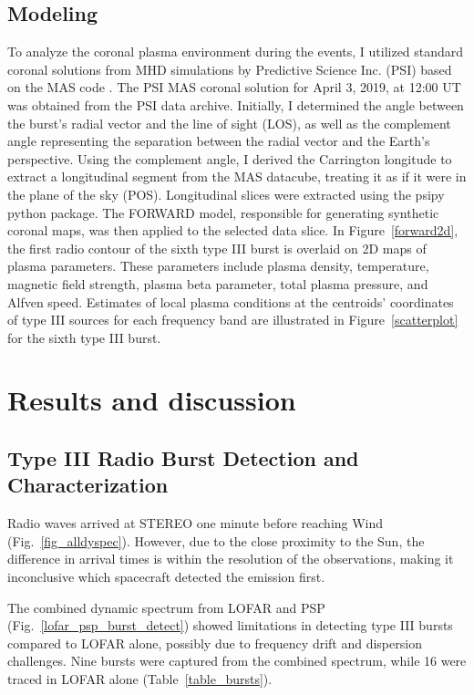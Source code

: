 \subsection{Modeling}
To analyze the coronal plasma environment during the events, I utilized standard coronal solutions from MHD simulations by Predictive Science Inc. (PSI) based on the MAS code \citep{mhd_1999}. The PSI MAS coronal solution for April 3, 2019, at 12:00 UT was obtained from the PSI data archive. Initially, I determined the angle between the burst's radial vector and the line of sight (LOS), as well as the complement angle representing the separation between the radial vector and the Earth's perspective. Using the complement angle, I derived the Carrington longitude to extract a longitudinal segment from the MAS datacube, treating it as if it were in the plane of the sky (POS). Longitudinal slices were extracted using the psipy python package. The FORWARD model, responsible for generating synthetic coronal maps, was then applied to the selected data slice. In Figure~\ref{forward2d}, the first radio contour of the sixth type III burst is overlaid on 2D maps of plasma parameters. These parameters include plasma density, temperature, magnetic field strength, plasma beta parameter, total plasma pressure, and Alfven speed. Estimates of local plasma conditions at the centroids' coordinates of type III sources for each frequency band are illustrated in Figure~\ref{scatterplot} for the sixth type III burst.

\section{Results and discussion}
\label{sec_ch3_results}
\subsection{Type III Radio Burst Detection and Characterization}
Radio waves arrived at STEREO one minute before reaching Wind (Fig.~\ref{fig_alldyspec}). However, due to the close proximity to the Sun, the difference in arrival times is within the resolution of the observations, making it inconclusive which spacecraft detected the emission first.

The combined dynamic spectrum from LOFAR and PSP (Fig.~\ref{lofar_psp_burst_detect}) showed limitations in detecting type III bursts compared to LOFAR alone, possibly due to frequency drift and dispersion challenges. Nine bursts were captured from the combined spectrum, while 16 were traced in LOFAR alone (Table~\ref{table_bursts}).

